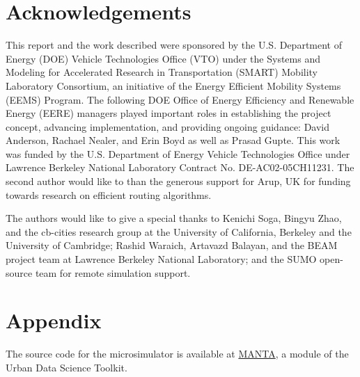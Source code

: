 \documentclass[final]{IEEEtran}
\begin{document}
\section{Acknowledgements}

This report and the work described were sponsored by the U.S. Department of Energy (DOE) Vehicle Technologies Office (VTO) under the Systems and Modeling for Accelerated Research in Transportation (SMART) Mobility Laboratory Consortium, an initiative of the Energy Efficient Mobility Systems (EEMS) Program. The following DOE Office of Energy Efficiency and Renewable Energy (EERE) managers played important roles in establishing the project concept, advancing implementation, and providing ongoing guidance: David Anderson, Rachael Nealer, and Erin Boyd as well as Prasad Gupte. This work was funded by the U.S. Department of Energy Vehicle Technologies Office under Lawrence Berkeley National Laboratory Contract No. DE-AC02-05CH11231. The second author would like to than the generous support for Arup, UK for funding towards research on efficient routing algorithms.

The authors would like to give a special thanks to Kenichi Soga, Bingyu Zhao, and the cb-cities research group at the University of California, Berkeley and the University of Cambridge; Rashid Waraich, Artavazd Balayan, and the BEAM project team at Lawrence Berkeley National Laboratory; and the SUMO open-source team for remote simulation support.

\section{Appendix}
The source code for the microsimulator is available at \href{https://github.com/UDST/manta}{MANTA}, a module of the Urban Data Science Toolkit.




\end{document}
